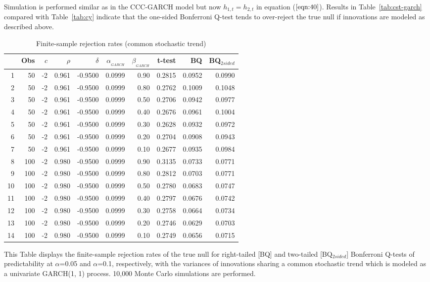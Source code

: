 \documentclass{article}
\begin{document}
Simulation is performed similar as in the CCC-GARCH model but now $h_{1, t} =h_{2, t}$ in equation ($\ref{eqn:40}$). Results in Table~\vref{tab:cst-garch} compared with Table~\vref{tab:cy}  indicate that the one-sided Bonferroni Q-test tends to over-reject the true null if innovations are modeled as described above.
\begin{table}[hbt]
\centering
\caption{Finite-sample rejection rates (common stochastic trend)}
\label{tab:cst-garch}
\begin{threeparttable}
\begin{tabular}{rrrrrrrrrr}
  \hline
  & Obs & $c$ & $\rho$ & $\delta$ & $\alpha_{_{GARCH}}$ & $\beta_{_{GARCH}}$ & t-test &BQ& BQ$_{{2sided}}$ \\ 
  \hline
1 & 50 & -2 & 0.961 & -0.9500 & 0.0999 & 0.90 & 0.2815 & 0.0952 & 0.0990 \\ 
  2 & 50 & -2 & 0.961 & -0.9500 & 0.0999 & 0.80 & 0.2762 & 0.1009 & 0.1048 \\ 
  3 & 50 & -2 & 0.961 & -0.9500 & 0.0999 & 0.50 & 0.2706 & 0.0942 & 0.0977 \\ 
  4 & 50 & -2 & 0.961 & -0.9500 & 0.0999 & 0.40 & 0.2676 & 0.0961 & 0.1004 \\ 
  5 & 50 & -2 & 0.961 & -0.9500 & 0.0999 & 0.30 & 0.2628 & 0.0932 & 0.0972 \\ 
  6 & 50 & -2 & 0.961 & -0.9500 & 0.0999 & 0.20 & 0.2704 & 0.0908 & 0.0943 \\ 
  7 & 50 & -2 & 0.961 & -0.9500 & 0.0999 & 0.10 & 0.2677 & 0.0935 & 0.0984 \\ 
  8 & 100 & -2 & 0.980 & -0.9500 & 0.0999 & 0.90 & 0.3135 & 0.0733 & 0.0771 \\ 
  9 & 100 & -2 & 0.980 & -0.9500 & 0.0999 & 0.80 & 0.2812 & 0.0703 & 0.0771 \\ 
  10 & 100 & -2 & 0.980 & -0.9500 & 0.0999 & 0.50 & 0.2780 & 0.0683 & 0.0747 \\ 
  11 & 100 & -2 & 0.980 & -0.9500 & 0.0999 & 0.40 & 0.2797 & 0.0676 & 0.0742 \\ 
  12 & 100 & -2 & 0.980 & -0.9500 & 0.0999 & 0.30 & 0.2758 & 0.0664 & 0.0734 \\ 
  13 & 100 & -2 & 0.980 & -0.9500 & 0.0999 & 0.20 & 0.2746 & 0.0629 & 0.0703 \\ 
  14 & 100 & -2 & 0.980 & -0.9500 & 0.0999 & 0.10 & 0.2749 & 0.0656 & 0.0715 \\ 
   \hline
\end{tabular}
 \begin{tablenotes}
 \small
\item This Table displays the finite-sample rejection rates of the true null for right-tailed [BQ] and two-tailed  [BQ$_{{2sided}}$] Bonferroni Q-tests of predictability at $\alpha$=0.05 and $\alpha$=0.1, respectively, with the variances of innovations sharing a common stochastic trend which is modeled as a univariate GARCH(1, 1) process. 10,000 Monte Carlo simulations are performed.
\end{tablenotes}
\end{threeparttable}
\end{table}
\end{document}

